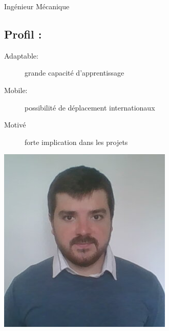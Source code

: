 \documentclass[10pt,a4paper,sans]{article}
\begin{document}

\begin{minipage}{0.36\textwidth}
    
\end{minipage}
\begin{minipage}{0.63\textwidth}
    Ingénieur Mécanique

    \begin{minipage}{0.75\textwidth}
        \subsection{Profil :}
        \begin{description}
            \item[Adaptable:]grande capacité d'apprentissage
            \item[Mobile:]possibilité de déplacement internationaux
            \item[Motivé]forte implication dans les projets
        \end{description}
    \end{minipage}
    \begin{minipage}{0.23\textwidth}
        \includegraphics[width=\textwidth]{img/image_CV.png}
    \end{minipage}
\end{minipage}
\end{document}
